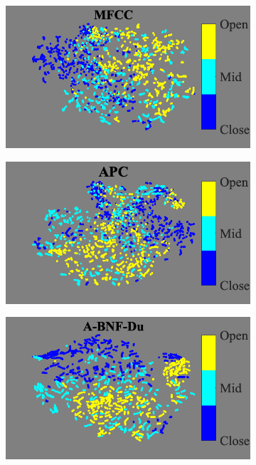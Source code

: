 \documentclass[transmag]{IEEEtran}
\begin{document}
\begin{figure}[!t]
    \begin{subfigure}{0.49\linewidth}
	   \centering
	   \includegraphics[width=1\linewidth]{tsne_af_height_mfcc_disc_bar_adjust_journal.png}
    \end{subfigure}
   \begin{subfigure}{0.49\linewidth}
	   \centering
	   \includegraphics[width=1\linewidth]{tsne_af_height_apc_unlab_600_disc_bar_adjust_journal.png}
    \end{subfigure}
    \newline
   \begin{subfigure}{0.49\linewidth}
	   \centering
	   \includegraphics[width=1\linewidth]{tsne_af_height_bnf_cgn_apc_input_disc_bar_adjust_journal.png}

\end{subfigure}
\end{figure}
\end{document}
